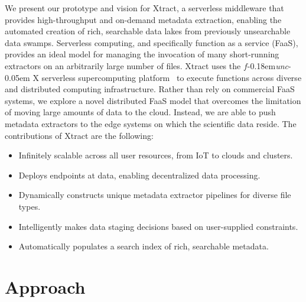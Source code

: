 \documentclass[sigconf, 9pt]{acmart}
\newcommand{\kyle}[1]{}
\newcommand{\kyle}[1]{{\textcolor{purple}{ Kyle: #1 }}}
\newcommand{\name}{Xtract}
\newcommand{\funcx}{$f$\kern-0.18em\emph{unc}\kern-0.05em X}
\begin{document}
We present our prototype and vision for \name{},
a serverless middleware that provides high-throughput and on-demand metadata 
extraction, enabling the automated creation of rich, searchable data lakes from previously unsearchable data swamps. 
Serverless computing, and specifically function as a service (FaaS),
provides an ideal model for managing the invocation of
many short-running extractors on an arbitrarily large number of files. 
\name{} uses the \funcx{} serverless supercomputing platform~\cite{chard2019serverless}
to execute functions across diverse and distributed computing infrastructure.
Rather than rely on commercial FaaS systems, we explore a novel distributed FaaS model 
that overcomes the limitation of moving large amounts of data to the cloud. 
Instead, we are able to push
metadata extractors to the edge systems on which the scientific data reside. 
The contributions of \name{} are the following: 
\begin{itemize}
\item Infinitely scalable across all user resources, from IoT to clouds and clusters. 
\item Deploys endpoints at data, enabling decentralized data processing. 
\item Dynamically constructs unique metadata extractor pipelines for diverse file types. 
\item Intelligently makes data staging decisions based on user-supplied constraints. 
\item Automatically populates a search index of rich, searchable metadata. 
\end{itemize}





\section{Approach}
\label{sec:approach}
\end{document}

